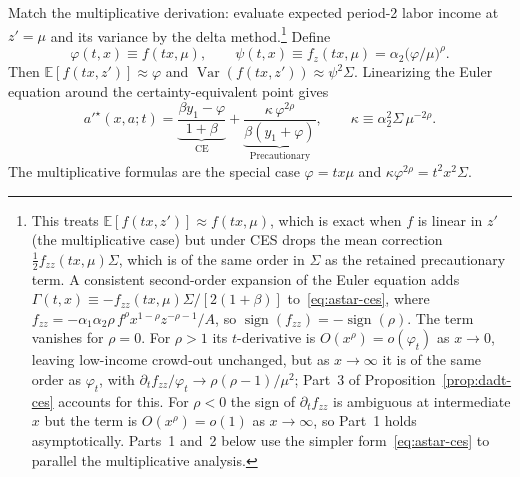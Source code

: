 \documentclass[12pt]{article}
\begin{document}
Match the multiplicative derivation: evaluate expected period-2 labor income at $z'=\mu$ and its variance by the delta method.\footnote{\label{fn:approx}This treats $\mathbb{E}[f(tx,z')]\approx f(tx,\mu)$, which is exact when $f$ is linear in $z'$ (the multiplicative case) but under CES drops the mean correction $\tfrac12 f_{zz}(tx,\mu)\Sigma$, which is of the same order in $\Sigma$ as the retained precautionary term. A consistent second-order expansion of the Euler equation adds
$\Gamma(t,x)\equiv -f_{zz}(tx,\mu)\Sigma/[2(1+\beta)]$ to~\eqref{eq:astar-ces}, where $f_{zz}=-\alpha_1\alpha_2\rho\,f^{\rho}x^{1-\rho}z^{-\rho-1}/A$, so $\operatorname{sign}(f_{zz})=-\operatorname{sign}(\rho)$. The term vanishes for $\rho=0$. For $\rho>1$ its $t$-derivative is $O(x^{\rho})=o(\varphi_t)$ as $x\to0$, leaving low-income crowd-out unchanged, but as $x\to\infty$ it is of the same order as $\varphi_t$, with $\partial_t f_{zz}/\varphi_t\to\rho(\rho-1)/\mu^{2}$; Part~3 of Proposition~\ref{prop:dadt-ces} accounts for this. For $\rho<0$ the sign of $\partial_t f_{zz}$ is ambiguous at intermediate $x$ but the term is $O(x^{\rho})=o(1)$ as $x\to\infty$, so Part~1 holds asymptotically. Parts~1 and~2 below use the simpler form~\eqref{eq:astar-ces} to parallel the multiplicative analysis.} Define
\begin{equation}
    \varphi(t,x)\equiv f(tx,\mu),
    \qquad
    \psi(t,x)\equiv f_z(tx,\mu)=\alpha_2\bigl(\varphi/\mu\bigr)^{\rho}.
\end{equation}
Then $\mathbb{E}[f(tx,z')]\approx\varphi$ and $\operatorname{Var}(f(tx,z'))\approx\psi^2\Sigma$. Linearizing the Euler equation around the certainty-equivalent point gives
\begin{equation}
    a'^{\star}(x,a;t)
    =
    \underbrace{\frac{\beta y_1-\varphi}{1+\beta}}_{\text{CE}}
    +
    \underbrace{\frac{\kappa\,\varphi^{2\rho}}{\beta(y_1+\varphi)}}_{\text{Precautionary}},
    \qquad
    \kappa\equiv \alpha_2^2\Sigma\,\mu^{-2\rho}.
    \label{eq:astar-ces}
\end{equation}
The multiplicative formulas are the special case $\varphi=tx\mu$ and $\kappa\varphi^{2\rho}=t^2x^2\Sigma$.
\end{document}
